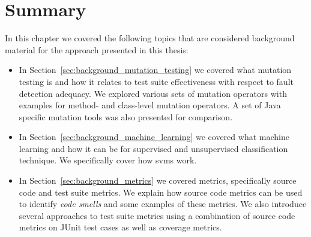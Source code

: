 \section{Summary}
\label{sec:background_summary}
In this chapter we covered the following topics that are considered background material for the approach presented in this thesis:

\begin{itemize}
  \item In Section~\ref{sec:background_mutation_testing} we covered what mutation testing is and how it relates to test suite effectiveness with respect to fault detection adequacy. We explored various sets of mutation operators with examples for method- and class-level mutation operators. A set of Java specific mutation tools was also presented for comparison.
  \item In Section~\ref{sec:background_machine_learning} we covered what machine learning and how it can be for supervised and unsupervised classification technique. We specifically cover how \gls{svm}s work.
  \item In Section~\ref{sec:background_metrics} we covered metrics, specifically source code and test suite metrics. We explain how source code metrics can be used to identify \emph{code smells} and some examples of these metrics. We also introduce several approaches to test suite metrics using a combination of source code metrics on JUnit test cases as well as coverage metrics.
\end{itemize}
